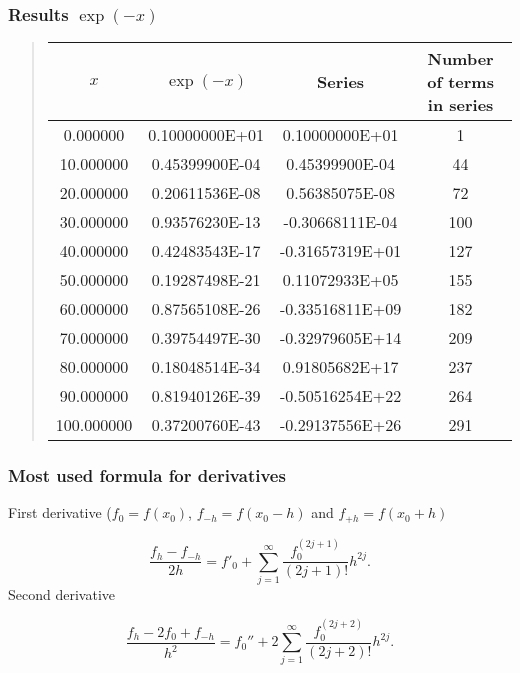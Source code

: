 \documentclass[handout]{beamer}
\newenvironment{block_mdfboxadmon}[1][]{\begin{block}{#1}}{\end{block}}
\begin{document}
\begin{frame}
\frametitle{Results $\exp{(-x)}$}

\begin{block_mdfboxadmon}


\begin{quote}
\begin{tabular}{cccc}
\hline
\multicolumn{1}{c}{ $x$ } & \multicolumn{1}{c}{ $\exp{(-x)}$ } & \multicolumn{1}{c}{ Series } & \multicolumn{1}{c}{ Number of terms in series } \\
\hline
0.000000                  & 0.10000000E+01            & 0.10000000E+01            & 1                         \\
10.000000                 & 0.45399900E-04            & 0.45399900E-04            & 44                        \\
20.000000                 & 0.20611536E-08            & 0.56385075E-08            & 72                        \\
30.000000                 & 0.93576230E-13            & -0.30668111E-04           & 100                       \\
40.000000                 & 0.42483543E-17            & -0.31657319E+01           & 127                       \\
50.000000                 & 0.19287498E-21            & 0.11072933E+05            & 155                       \\
60.000000                 & 0.87565108E-26            & -0.33516811E+09           & 182                       \\
70.000000                 & 0.39754497E-30            & -0.32979605E+14           & 209                       \\
80.000000                 & 0.18048514E-34            & 0.91805682E+17            & 237                       \\
90.000000                 & 0.81940126E-39            & -0.50516254E+22           & 264                       \\
100.000000                & 0.37200760E-43            & -0.29137556E+26           & 291                       \\
\hline
\end{tabular}
\end{quote}

\noindent
\end{block_mdfboxadmon}
\end{frame}

\begin{frame}
\frametitle{Most used formula for derivatives}

\begin{block_mdfboxadmon}
First derivative  ($f_0 = f(x_0)$, $f_{-h}=f(x_0-h)$ and $f_{+h}=f(x_0+h)$

\[
   \frac{f_h-f_{-h}}{2h}=f'_0+\sum_{j=1}^{\infty}\frac{f_0^{(2j+1)}}{(2j+1)!}h^{2j}.
\]
Second derivative

\[
 \frac{ f_h -2f_0 +f_{-h}}{h^2}=f_0''+2\sum_{j=1}^{\infty}\frac{f_0^{(2j+2)}}{(2j+2)!}h^{2j}.
\]
\end{block_mdfboxadmon}
\end{frame}
\end{document}
